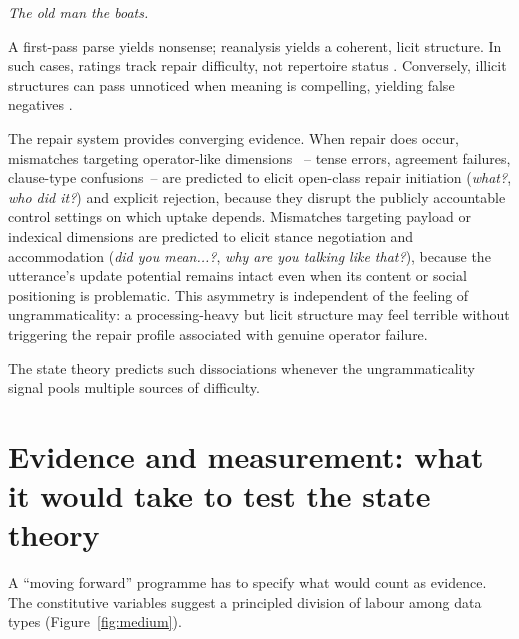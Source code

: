 \documentclass[12pt,letterpaper]{article}
\newcommand{\mention}[1]{\textit{#1}}
\begin{document}
\ea \mention{The old man the boats.} \autocite{ritchie1984}\label{ex:old-man}
\z

A first-pass parse yields nonsense; reanalysis yields a coherent, licit structure. In such cases, ratings track repair difficulty, not repertoire status \autocite[cf.][on acceptability as an introspective report of processing cost]{gibson2025}. Conversely, illicit structures can pass unnoticed when meaning is compelling, yielding false negatives \autocite{pullum2009}.

The repair system provides converging evidence. When repair does occur, mismatches targeting operator-like dimensions \autocite{reynolds2026operators}~-- tense errors, agreement failures, clause-type confusions~-- are predicted to elicit open-class repair initiation (\mention{what?}, \mention{who did it?}) and explicit rejection, because they disrupt the publicly accountable control settings on which uptake depends. Mismatches targeting payload or indexical dimensions are predicted to elicit stance negotiation and accommodation (\mention{did you mean...?}, \mention{why are you talking like that?}), because the utterance's update potential remains intact even when its content or social positioning is problematic. This asymmetry is independent of the feeling of ungrammaticality: a processing-heavy but licit structure may feel terrible without triggering the repair profile associated with genuine operator failure.

The state theory predicts such dissociations whenever the ungrammaticality signal pools multiple sources of difficulty.

\section[Evidence and measurement]{Evidence and measurement: what it would take to test the state theory}\label{sec:evidence}

A \enquote{moving forward} programme has to specify what would count as evidence. The constitutive variables suggest a principled division of labour among data types (Figure~\ref{fig:medium}).
\end{document}

